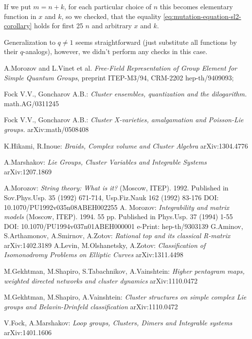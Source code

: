 \documentclass{article}
\newcommand {\?}{\textit{???}}
\begin{document}
If we put $m = n + k$, for each particular choice of $n$ this becomes elementary function in $x$ and $k$,
so we checked, that the equality \eqref{eq:mutation-equation-sl2-corollary} holds for first 25 $n$ and
arbitrary $x$ and $k$.

Generalization to $q \neq 1$ seems straightforward (just substitute all functions by their $q$-analogs),
however, we didn't perform any checks in this case.

\begin{thebibliography}{12}

A.Morozov and L.Vinet et al. {\it Free-Field Representation of Group Element for Simple Quantum Groups},
preprint ITEP-M3/94, CRM-2202 hep-th/9409093;

Fock V.V., Goncharov A.B.: {\it Cluster ensembles, quantization and the dilogarithm.}
math.AG/0311245

Fock V.V., Goncharov A.B.: {\it Cluster X-varieties, amalgamation and Poisson-Lie groups.}
arXiv:math/0508408

K.Hikami, R.Inoue: {\it Braids, Complex volume and Cluster Algebra}
arXiv:1304.4776

A.Marshakov: {\it Lie Groups, Cluster Variables and Integrable Systems}
arXiv:1207.1869

A.Morozov: {\it String theory: What is it? }
 (Moscow, ITEP). 1992.
Published in Sov.Phys.Usp. 35 (1992) 671-714, Usp.Fiz.Nauk 162 (1992) 83-176
DOI: 10.1070/PU1992v035n08ABEH002255
A. Morozov: {\it Integrability and matrix models}
 (Moscow, ITEP). 1994. 55 pp.
Published in Phys.Usp. 37 (1994) 1-55
DOI: 10.1070/PU1994v037n01ABEH000001
e-Print: hep-th/9303139 
G.Aminov, S.Arthamonov, A.Smirnov, A.Zotov: {\it Rational top and its classical R-matrix}
arXiv:1402.3189
A.Levin, M.Olshanetsky, A.Zotov: {\it Classification of Isomonodromy Problems on Elliptic Curves}
arXiv:1311.4498


M.Gekhtman, M.Shapiro, S.Tabachnikov, A.Vainshtein: {\it Higher pentagram maps, weighted directed networks
and cluster dynamics}
arXiv:1110.0472

M.Gekhtman, M.Shapiro, A.Vainshtein: {\it Cluster structures on simple complex Lie groups and Belavin-Drinfeld
classification}
arXiv:1110.0472


V.Fock, A.Marshakov: {\it Loop groups, Clusters, Dimers and Integrable systems}
arXiv:1401.1606

\end{thebibliography}
\end{document}
